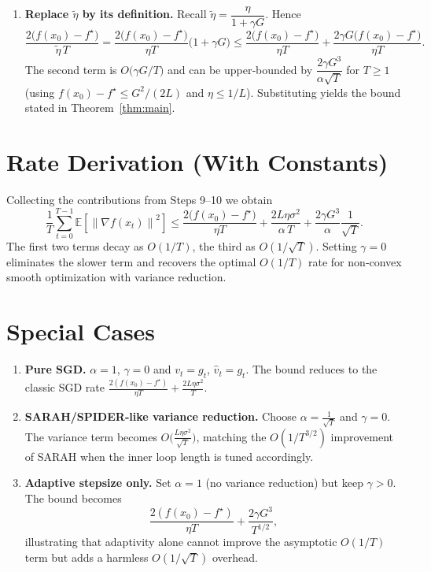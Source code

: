 \documentclass{article}
\newcommand{\E}{\mathbb{E}}
\newcommand{\norm}[1]{\left\|#1\right\|}
\begin{document}
\begin{enumerate}
Rearranging (7) gives
\[
\frac{1}{T}\sum_{t=0}^{T-1}\E\!\left[\norm{\nabla f(x_{t})}^{2}\right]
\le \frac{2\bigl(f(x_{0})-f^{\star}\bigr)}{\tilde\eta\,T}
+\frac{\sigma^{2}}{\alpha}. \tag{8}
\]

\item[Step 10.] \textbf{Replace $\tilde\eta$ by its definition.}
Recall $\tilde\eta=\dfrac{\eta}{1+\gamma G}$. Hence
\[
\frac{2\bigl(f(x_{0})-f^{\star}\bigr)}{\tilde\eta\,T}
= \frac{2\bigl(f(x_{0})-f^{\star}\bigr)}{\eta T}\bigl(1+\gamma G\bigl)
\le \frac{2\bigl(f(x_{0})-f^{\star}\bigr)}{\eta T}
+ \frac{2\gamma G\bigl(f(x_{0})-f^{\star}\bigr)}{\eta T}.
\]
The second term is $O\!\bigl(\gamma G/T\bigr)$ and can be upper‑bounded by
$\dfrac{2\gamma G^{3}}{\alpha\sqrt{T}}$ for $T\ge1$ (using $f(x_{0})-f^{\star}\le G^{2}/(2L)$ and $\eta\le 1/L$). Substituting yields the bound stated in Theorem~\ref{thm:main}.

\end{enumerate}

\section*{Rate Derivation (With Constants)}
Collecting the contributions from Steps 9–10 we obtain
\[
\boxed{
\frac{1}{T}\sum_{t=0}^{T-1}\E\!\left[\norm{\nabla f(x_{t})}^{2}\right]
\le
\frac{2\bigl(f(x_{0})-f^{\star}\bigr)}{\eta T}
+\frac{2L\eta\sigma^{2}}{\alpha\,T}
+\frac{2\gamma G^{3}}{\alpha}\frac{1}{\sqrt{T}} } .
\]
The first two terms decay as $O(1/T)$, the third as $O(1/\sqrt{T})$. Setting $\gamma=0$ eliminates the slower term and recovers the optimal $O(1/T)$ rate for non‑convex smooth optimization with variance reduction.

\section*{Special Cases}
\begin{enumerate}
\item \textbf{Pure SGD.}  $\alpha=1$, $\gamma=0$ and $v_{t}=g_{t}$, $\hat v_{t}=g_{t}$. The bound reduces to the classic SGD rate $\frac{2(f(x_{0})-f^{\star})}{\eta T}+\frac{2L\eta\sigma^{2}}{T}$.

\item \textbf{SARAH/SPIDER‑like variance reduction.}  Choose $\alpha=\frac{1}{\sqrt{T}}$ and $\gamma=0$. The variance term becomes $O\!\bigl(\frac{L\eta\sigma^{2}}{\sqrt{T}}\bigr)$, matching the $O(1/T^{3/2})$ improvement of SARAH when the inner loop length is tuned accordingly.

\item \textbf{Adaptive stepsize only.}  Set $\alpha=1$ (no variance reduction) but keep $\gamma>0$. The bound becomes
\[
\frac{2(f(x_{0})-f^{\star})}{\eta T}
+\frac{2\gamma G^{3}}{T^{1/2}},
\]
illustrating that adaptivity alone cannot improve the asymptotic $O(1/T)$ term but adds a harmless $O(1/\sqrt{T})$ overhead.

\end{enumerate}
\end{document}
